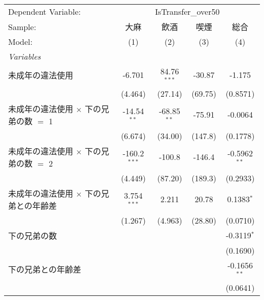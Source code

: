 \documentclass{article}
\begin{document}
\begin{landscape}


\begingroup
\centering
\begin{threeparttable}[b]
   \begin{tabular}{lcccc}
      \tabularnewline \midrule \midrule
      Dependent Variable: & \multicolumn{4}{c}{IsTransfer\_over50}\\
      Sample:                                       & 大麻           & 飲酒          & 喫煙    & 総合 \\   
      Model:                                        & (1)            & (2)           & (3)     & (4)\\  
      \midrule
      \emph{Variables}\\
      未成年の違法使用                              & -6.701         & 84.76$^{***}$ & -30.87  & -1.175\\   
                                                    & (4.464)        & (27.14)       & (69.75) & (0.8571)\\   
      未成年の違法使用 $\times$ 下の兄弟の数 $=$ 1  & -14.54$^{**}$  & -68.85$^{**}$ & -75.91  & -0.0064\\   
                                                    & (6.674)        & (34.00)       & (147.8) & (0.1778)\\   
      未成年の違法使用 $\times$ 下の兄弟の数 $=$ 2  & -160.2$^{***}$ & -100.8        & -146.4  & -0.5962$^{**}$\\   
                                                    & (4.449)        & (87.20)       & (189.3) & (0.2933)\\   
      未成年の違法使用 $\times$ 下の兄弟との年齢差  & 3.754$^{***}$  & 2.211         & 20.78   & 0.1383$^{*}$\\   
                                                    & (1.267)        & (4.963)       & (28.80) & (0.0710)\\   
      下の兄弟の数                                  &                &               &         & -0.3119$^{*}$\\   
                                                    &                &               &         & (0.1690)\\   
      下の兄弟との年齢差                            &                &               &         & -0.1656$^{**}$\\   
                                                    &                &               &         & (0.0641)\\   

\end{tabular}
\end{threeparttable}
\end{landscape}
\end{document}
